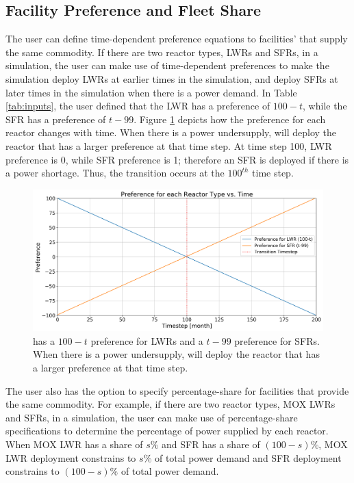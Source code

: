 \subsection{Facility Preference and Fleet Share}
\label{sec:pref}
The user can define time-dependent preference equations to facilities'  
that supply the same commodity. 
If there are two reactor types, \glspl{LWR} and \glspl{SFR}, in a simulation, 
the user can make use of time-dependent 
preferences to make the simulation deploy \glspl{LWR} at earlier times 
in the simulation, and deploy SFRs at later times in the 
simulation when there is a power demand. 
In Table \ref{tab:inputs}, 
the user defined that the \gls{LWR} has a preference of $100-t$, while 
the SFR has a preference of $t-99$. 
Figure \ref{fig:prefplot} depicts how the preference for each reactor changes 
with time. 
When there is a power undersupply, \deploy will deploy the reactor that has a
larger preference at that time step.
At time step 100, \gls{LWR} preference is 0, while SFR preference is 1; 
therefore an SFR is deployed if there is a power shortage. 
Thus, the transition occurs at the $100^{th}$ time step.

\begin{figure}[]
	\begin{center}
		\includegraphics[width=\linewidth]{./figures/prefplot}
	\end{center}	
		\caption{\deploy has a $100-t$ preference for \glspl{LWR} and a $t-99$ preference for SFRs.
		When there is a power undersupply, \deploy will deploy the reactor that has a
		larger preference at that time step.}
	\label{fig:prefplot}
\end{figure}

The user also has the option to specify percentage-share for facilities 
that provide the same commodity. 
For example, if there are two reactor types, \gls{MOX} \glspl{LWR} and SFRs, in a simulation,
the user can make use of percentage-share specifications to determine the 
percentage of power supplied by each reactor.   
When MOX \gls{LWR} has a share of $s\%$ and 
\gls{SFR} has a share of $(100-s)\%$, 
MOX \gls{LWR} deployment constrains to $s\%$ of total power demand 
and SFR deployment constrains to $(100-s)\%$ of total power demand.  

